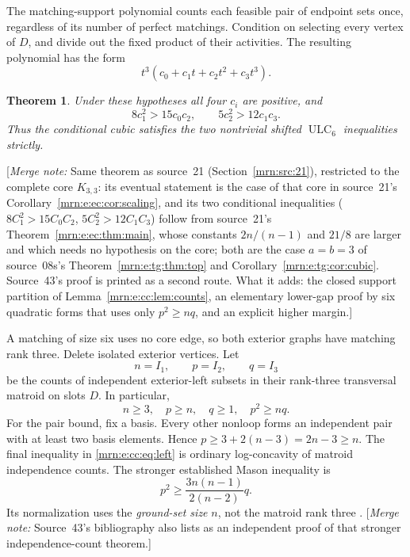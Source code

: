 \documentclass[11pt,a4paper]{article}
\newtheorem{theorem}{Theorem}[section]
\theoremstyle{remark}\newtheorem{remark}[theorem]{Remark}
\newcommand{\ULC}{\operatorname{ULC}}      %
\newcommand{\mnote}[1]{[\textit{Merge note:} #1]}
\begin{document}
The matching-support polynomial counts each feasible pair of endpoint sets once, regardless of its number of perfect matchings. Condition on selecting every vertex of $D$, and divide out the fixed product of their activities. The resulting polynomial has the form
\begin{equation}\label{mrn:e:cc:eq:cubic}
 t^3(c_0+c_1t+c_2t^2+c_3t^3).
\end{equation}
\begin{theorem}\label{mrn:e:cc:thm:main}
Under these hypotheses all four $c_i$ are positive, and
\begin{equation}\label{mrn:e:cc:eq:targets}
 8c_1^2>15c_0c_2,\qquad 5c_2^2>12c_1c_3.
\end{equation}
Thus the conditional cubic satisfies the two nontrivial shifted $\ULC_6$ inequalities strictly.
\end{theorem}
\mnote{Same theorem as source~21 (Section~\ref{mrn:src:21}), restricted to the complete core $K_{3,3}$: its eventual statement is the case of that core in source~21's Corollary~\ref{mrn:e:ec:cor:scaling}, and its two conditional inequalities ($8C_1^2>15C_0C_2$, $5C_2^2>12C_1C_3$) follow from source~21's Theorem~\ref{mrn:e:ec:thm:main}, whose constants $2n/(n-1)$ and $21/8$ are larger and which needs no hypothesis on the core; both are the case $a=b=3$ of source~08s's Theorem~\ref{mrn:e:tg:thm:top} and Corollary~\ref{mrn:e:tg:cor:cubic}. Source~43's proof is printed as a second route. What it adds: the closed support partition of Lemma~\ref{mrn:e:cc:lem:counts}, an elementary lower-gap proof by six quadratic forms that uses only $p^2\ge nq$, and an explicit higher margin.}

A matching of size six uses no core edge, so both exterior graphs have matching rank three. Delete isolated exterior vertices. Let
\[
 n=I_1,\qquad p=I_2,\qquad q=I_3
\]
be the counts of independent exterior-left subsets in their rank-three transversal matroid on slots $D$. In particular,
\begin{equation}\label{mrn:e:cc:eq:left}
 n\ge3,\quad p\ge n,\quad q\ge1,\quad p^2\ge nq.
\end{equation}
For the pair bound, fix a basis. Every other nonloop forms an independent pair with at least two basis elements. Hence $p\ge3+2(n-3)=2n-3\ge n$. The final inequality in \eqref{mrn:e:cc:eq:left} is ordinary log-concavity of matroid independence counts. The stronger established Mason inequality is
\[
 p^2\ge \frac{3n(n-1)}{2(n-2)}q.
\]
Its normalization uses the \emph{ground-set size} $n$, not the matroid rank three \cite[Theorem 4.14]{b:BH}. \mnote{Source~43's bibliography also lists \cite{b:ALOV} as an independent proof of that stronger independence-count theorem.}
\end{document}
